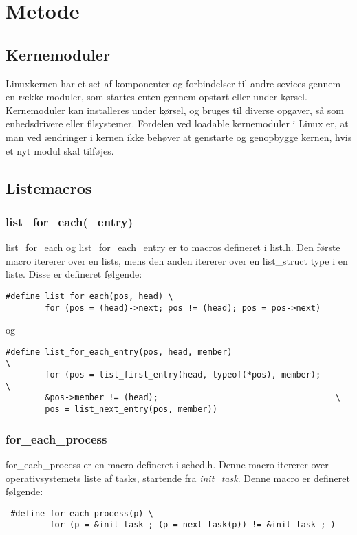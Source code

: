 \section{Metode}
\subsection{Kernemoduler}
Linuxkernen har et set af komponenter og forbindelser til andre sevices gennem en række moduler, som startes enten gennem opstart eller under kørsel. Kernemoduler kan installeres under kørsel, og bruges til diverse opgaver, så som enhedsdrivere eller filsystemer. Fordelen ved loadable kernemoduler i Linux er, at man ved ændringer i kernen ikke behøver at genstarte og genopbygge kernen, hvis et nyt modul skal tilføjes.
\subsection{Listemacros}
\subsubsection{list\_for\_each(\_entry)}
list\_for\_each og list\_for\_each\_entry er to macros defineret i list.h. Den første macro itererer over en lists, mens den anden itererer over en list\_struct type i en liste.
Disse er defineret følgende:\\
\begin{lstlisting}
#define list_for_each(pos, head) \
        for (pos = (head)->next; pos != (head); pos = pos->next)
\end{lstlisting}

og
\\
\begin{lstlisting}
#define list_for_each_entry(pos, head, member)                          \
        for (pos = list_first_entry(head, typeof(*pos), member);        \
        &pos->member != (head);                                    \
        pos = list_next_entry(pos, member))
\end{lstlisting}
\subsubsection{for\_each\_process}
for\_each\_process er en macro defineret i sched.h. Denne macro itererer over operativsystemets liste af tasks, startende fra \textit{init\_task}. Denne macro er defineret følgende:\\
\begin{lstlisting}
 #define for_each_process(p) \
         for (p = &init_task ; (p = next_task(p)) != &init_task ; )
\end{lstlisting}
